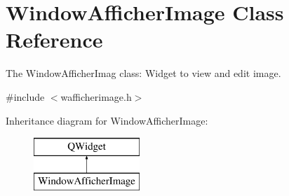\hypertarget{class_window_afficher_image}{}\section{Window\+Afficher\+Image Class Reference}
\label{class_window_afficher_image}


The Window\+Afficher\+Imag class\+: Widget to view and edit image.  




{\ttfamily \#include $<$wafficherimage.\+h$>$}

Inheritance diagram for Window\+Afficher\+Image\+:\begin{figure}[H]
\begin{center}
\leavevmode
\includegraphics[height=2.000000cm]{class_window_afficher_image}
\end{center}
\end{figure}

